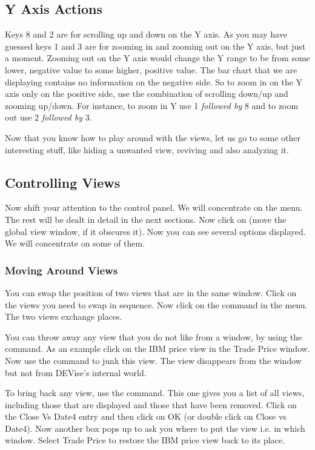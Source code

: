 \subsection{Y Axis Actions}

Keys 8 and 2 are for scrolling up and down on the Y axis. As you may
have guessed keys 1 and 3 are for zooming in and zooming out on the Y
axis, but just a moment. Zooming out on the Y axis would change the Y
range to be from some lower, negative value to some higher, positive
value. The bar chart that we are displaying contains no information on
the negative side. So to zoom in on the Y axis only on the positive
side, use the combination of scrolling down/up and zooming
up/down. For instance, to zoom in Y use 1 {\em followed by} 8 and to
zoom out use 2 {\em followed by} 3.

Now that you know how to play around with the views, let us go to some
other interesting stuff, like hiding a unwanted view, reviving and
also analyzing it.

\subsection{Controlling Views}

Now shift your attention to the control panel. We will concentrate on
the  menu. The rest will be dealt in detail in the next
sections. Now click on  (move the global view window, if it
obscures it). Now you can see several options displayed. We will
concentrate on some of them.

\subsubsection{Moving Around Views}

You can swap the position of two views that are in the same
window. Click on the views you need to swap in sequence. Now click on
the  command in the  menu. The two
views exchange places.

You can throw away any view that you do not like from a window, by
using the  command. As an example click on
the IBM price view in the Trade Price window. Now use the  command to junk this view. The view disappears from the
window but not from DEVise's internal world.

To bring back any view, use the 
command. This one gives you a list of all views, including those that
are displayed and those that have been removed. Click on the Close Vs
Date4 entry and then click on OK (or double click on Close vs Date4).
Now another box pops up to ask you where to put the view i.e. in which
window. Select Trade Price to restore the IBM price view back to its
place.


